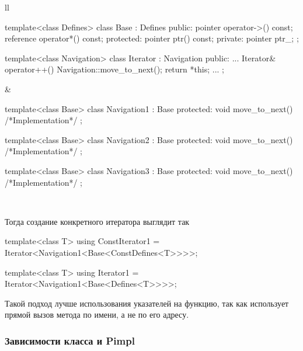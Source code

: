 \begin{center}
\begin{tabular}{ll}
{
\begin{minipage}[\baselineskip]{8cm}
\begin{cppcode}[numbers = none]

template<class Defines>
class Base : Defines {
public:
  pointer operator->() const;
  reference operator*() const;
protected:
  pointer ptr() const;
private:
  pointer ptr_;
};

template<class Navigation>
class Iterator : Navigation {
public:
  ...
  Iterator& operator++() {
    Navigation::move_to_next();
    return *this;  
  }
  ...
};

\end{cppcode}
\end{minipage}
}&{
\begin{minipage}[\baselineskip]{8cm}
\begin{cppcode}[numbers = none]
template<class Base>
class Navigation1 : Base {
protected:
  void move_to_next() {
    /*Implementation*/
  }
};

template<class Base>
class Navigation2 : Base {
protected:
  void move_to_next() {
    /*Implementation*/
  }
};

template<class Base>
class Navigation3 : Base {
protected:
  void move_to_next() {
    /*Implementation*/
  }
};
\end{cppcode}
\end{minipage}
}\\
\end{tabular}
\end{center}
Тогда создание конкретного итератора выглядит так
\begin{cppcode}
template<class T>
using ConstIterator1 = Iterator<Navigation1<Base<ConstDefines<T>>>>;

template<class T>
using Iterator1 = Iterator<Navigation1<Base<Defines<T>>>>;
\end{cppcode}
Такой подход лучше использования указателей на функцию, так как использует прямой вызов метода по имени, а не по его адресу.

\subsubsection{Зависимости класса и Pimpl}
\label{section::Pimpl}


